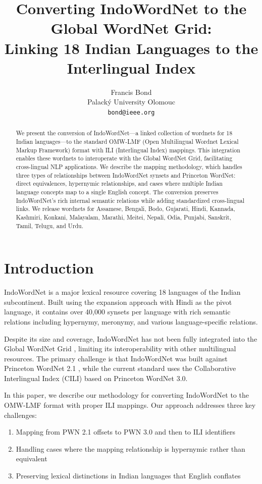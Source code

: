 \documentclass[11pt]{article}
\title{Converting IndoWordNet to the Global WordNet Grid:\\Linking 18 Indian Languages to the Interlingual Index}
\author{Francis Bond \\
  Palacký University Olomouc \\
  \texttt{bond@ieee.org}}
\begin{document}
\maketitle

\begin{abstract}
We present the conversion of IndoWordNet---a linked collection of wordnets for 18 Indian languages---to the standard OMW-LMF (Open Multilingual Wordnet Lexical Markup Framework) format with ILI (Interlingual Index) mappings.
This integration enables these wordnets to interoperate with the Global WordNet Grid, facilitating cross-lingual NLP applications.
We describe the mapping methodology, which handles three types of relationships between IndoWordNet synsets and Princeton WordNet: direct equivalences, hypernymic relationships, and cases where multiple Indian language concepts map to a single English concept.
The conversion preserves IndoWordNet's rich internal semantic relations while adding standardized cross-lingual links.
We release wordnets for Assamese, Bengali, Bodo, Gujarati, Hindi, Kannada, Kashmiri, Konkani, Malayalam, Marathi, Meitei, Nepali, Odia, Punjabi, Sanskrit, Tamil, Telugu, and Urdu.
\end{abstract}

\section{Introduction}

IndoWordNet \cite{bhattacharyya2010indowordnet} is a major lexical resource covering 18 languages of the Indian subcontinent.
Built using the expansion approach with Hindi as the pivot language, it contains over 40,000 synsets per language with rich semantic relations including hypernymy, meronymy, and various language-specific relations.

Despite its size and coverage, IndoWordNet has not been fully integrated into the Global WordNet Grid \cite{bond2016cili}, limiting its interoperability with other multilingual resources.
The primary challenge is that IndoWordNet was built against Princeton WordNet 2.1 \cite{fellbaum1998wordnet}, while the current standard uses the Collaborative Interlingual Index (CILI) based on Princeton WordNet 3.0.

In this paper, we describe our methodology for converting IndoWordNet to the OMW-LMF format with proper ILI mappings.
Our approach addresses three key challenges:
\begin{enumerate}
\item Mapping from PWN 2.1 offsets to PWN 3.0 and then to ILI identifiers
\item Handling cases where the mapping relationship is hypernymic rather than equivalent
\item Preserving lexical distinctions in Indian languages that English conflates
\end{enumerate}
\end{document}
